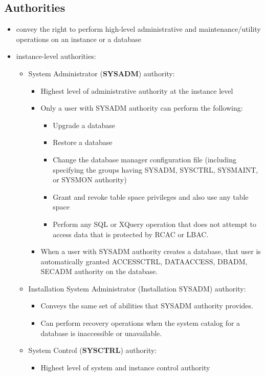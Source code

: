 \documentclass{article}
\begin{document}
\subsection{Authorities}
\begin{itemize}
\item convey the right to perform high-level administrative and maintenance/utility operations
on an instance or a database
\item instance-level authorities:
\begin{itemize}
\item System Administrator (\textbf{SYSADM}) authority:
	\begin{itemize}
	\item Highest level of administrative authority at the instance level
	\item Only a user with SYSADM authority can perform the following:
		\begin{itemize}
		\item Upgrade a database
		\item Restore a database
		\item Change the database manager configuration file (including specifying the groups
		having SYSADM, SYSCTRL, SYSMAINT, or SYSMON authority)
		\item Grant and revoke table space privileges and also use any table space
		\item Perform any SQL or XQuery operation that does not attempt to access data that is 
		protected by RCAC or LBAC.
		\end{itemize}
	\item When a user with SYSADM authority creates a database, that user is automatically
	granted ACCESSCTRL, DATAACCESS, DBADM, SECADM authority on the database.
	\end{itemize}
\item Installation System Administrator (Installation SYSADM) authority:
	\begin{itemize}
	\item Conveys the same set of abilities that SYSADM authority provides.
	\item Can perform recovery operations when the system catalog for a database is inaccessible or 
	unavailable.
	\end{itemize}
\item System Control (\textbf{SYSCTRL}) authority:
	\begin{itemize}
	\item Highest level of system and instance control authority

\end{itemize}
\end{itemize}
\end{itemize}
\end{document}
